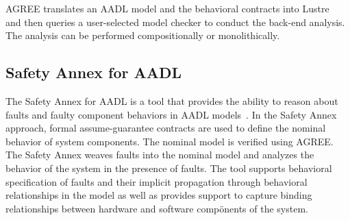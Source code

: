 AGREE translates an AADL model and the behavioral contracts into Lustre~\cite{Halbwachs91:IEEE} and then queries a user-selected
model checker to conduct the back-end analysis. The analysis can be performed compositionally or monolithically.

\subsection{Safety Annex for AADL}
The Safety Annex for AADL is a tool that provides the ability to reason about faults and faulty component behaviors in AADL models~\cite{Stewart17:IMBSA,SATechReport}. In the Safety Annex approach, formal assume-guarantee contracts are used to define the nominal behavior of system components. The nominal model is verified using AGREE. The Safety Annex weaves faults into the nominal model and analyzes the behavior of the system in the presence of faults. The tool supports behavioral specification of faults and their implicit propagation through behavioral relationships in the model as well as provides support to capture binding relationships between hardware and software compönents of the system. 

